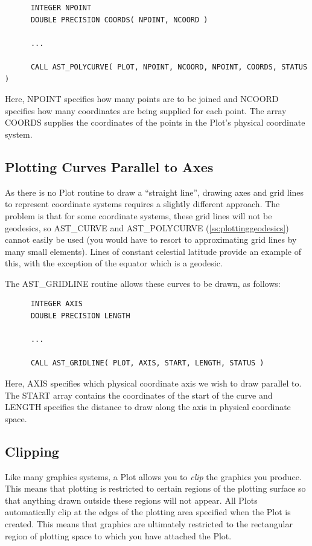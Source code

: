 \documentclass[twoside,11pt]{article}
\newcommand{\htmlref}[2]{#1}
\newcommand{\secref}[1]{\S\ref{#1}}
\renewcommand{\secref}[1]{\ref{#1}}
\begin{document}
\small
\begin{verbatim}
      INTEGER NPOINT
      DOUBLE PRECISION COORDS( NPOINT, NCOORD )

      ...

      CALL AST_POLYCURVE( PLOT, NPOINT, NCOORD, NPOINT, COORDS, STATUS )
\end{verbatim}
\normalsize

Here, NPOINT specifies how many points are to be joined and NCOORD
specifies how many coordinates are being supplied for each point.  The
array COORDS supplies the coordinates of the points in the Plot's
physical coordinate system.

\subsection{Plotting Curves Parallel to Axes}

As there is no \htmlref{Plot}{Plot} routine to draw a ``straight line'', drawing axes
and grid lines to represent coordinate systems requires a slightly
different approach. The problem is that for some coordinate systems,
these grid lines will not be geodesics, so \htmlref{AST\_CURVE}{AST_CURVE} and
\htmlref{AST\_POLYCURVE}{AST_POLYCURVE} (\secref{ss:plottinggeodesics}) cannot easily be used
(you would have to resort to approximating grid lines by many small
elements). Lines of constant celestial latitude provide an example of
this, with the exception of the equator which is a geodesic.

The \htmlref{AST\_GRIDLINE}{AST_GRIDLINE} routine allows these curves to be drawn, as follows:

\small
\begin{verbatim}
      INTEGER AXIS
      DOUBLE PRECISION LENGTH

      ...

      CALL AST_GRIDLINE( PLOT, AXIS, START, LENGTH, STATUS )
\end{verbatim}
\normalsize

Here, AXIS specifies which physical coordinate axis we wish to draw
parallel to. The START array contains the coordinates of the start of
the curve and LENGTH specifies the distance to draw along the axis in
physical coordinate space.

\subsection{\label{ss:clipping}Clipping}

Like many graphics systems, a \htmlref{Plot}{Plot} allows you to {\em{clip}} the graphics
you produce. This means that plotting is restricted to certain regions
of the plotting surface so that anything drawn outside these regions
will not appear.  All Plots automatically clip at the edges of the
plotting area specified when the Plot is created. This means that
graphics are ultimately restricted to the rectangular region of
plotting space to which you have attached the Plot.
\end{document}
